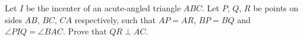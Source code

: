 Let $I$ be the incenter of an acute-angled triangle $ABC$. Let $P$, $Q$, $R$ be points on sides $AB$, $BC$, $CA$ respectively, such that $AP=AR$, $BP=BQ$ and $\angle PIQ = \angle BAC$. Prove that $QR \perp AC$.